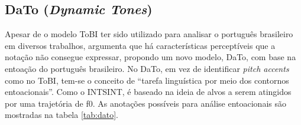 \subsection{DaTo (\emph{Dynamic Tones})}
Apesar de o modelo ToBI ter sido utilizado para analisar o
português brasileiro em diversos trabalhos,  argumenta que
há características perceptíveis que a notação não consegue expressar, propondo
um novo modelo, DaTo, com base na entoação do português brasileiro. No DaTo, em
vez de identificar \emph{pitch accents} como no ToBI, tem-se o conceito de ``tarefa
linguística por meio dos contornos entoacionais''. Como o INTSINT, é baseado na
ideia de alvos a serem atingidos por uma trajetória de f0. As anotações
possíveis para análise entoacionais são mostradas na tabela \ref{tab:dato}.

